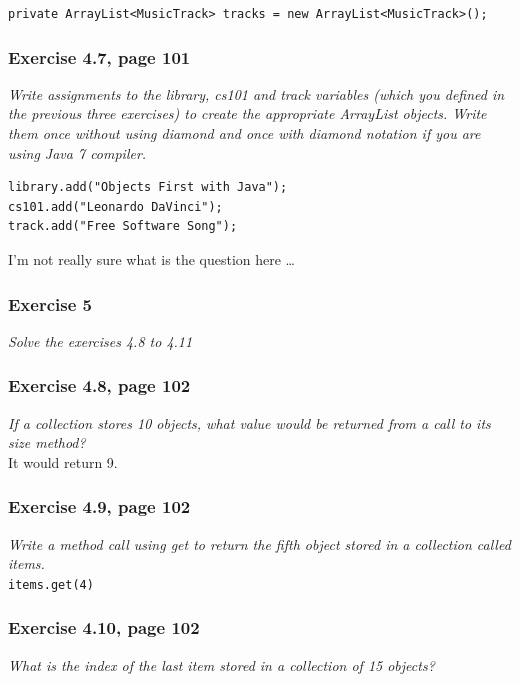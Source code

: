 \lstinline{private ArrayList<MusicTrack> tracks = new ArrayList<MusicTrack>();}

\subsubsection*{Exercise 4.7, page 101}
\textit{Write assignments to the library, cs101 and track variables (which
you defined in the previous three exercises) to create the appropriate 
ArrayList objects. Write them once without using diamond and once with
diamond notation if you are using Java 7 compiler.}\\

\begin{lstlisting}
library.add("Objects First with Java");
cs101.add("Leonardo DaVinci");
track.add("Free Software Song");
\end{lstlisting}

I'm not really sure what is the question here \dots

\subsubsection*{Exercise 5}
\textit{Solve the exercises 4.8 to 4.11}\\

\subsubsection*{Exercise 4.8, page 102}
\textit{If a collection stores 10 objects, what value would be returned from
a call to its size method?}\\

It would return 9.

\subsubsection*{Exercise 4.9, page 102}
\textit{Write a method call using get to return the fifth object stored in a
collection called items.}\\

\lstinline{items.get(4)}

\subsubsection*{Exercise 4.10, page 102}
\textit{What is the index of the last item stored in a collection of 15
objects?}\\

